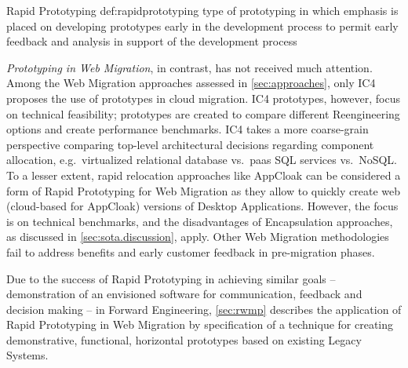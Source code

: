 \vspace{-10pt}
\begin{thesisdefinition}{Rapid Prototyping \autocite{ISO/IEEE24765Vocabulary}}{def:rapidprototyping}
type of prototyping in which emphasis is placed on developing prototypes early in the development process to permit early feedback and analysis in support of the development process
\end{thesisdefinition}

\emph{\gls{Prototyping} in Web Migration}, in contrast, has not received much attention.
Among the \gls{Web Migration} approaches assessed in \cref{sec:approaches}, only IC4 \autocite{Fowley2017CloudSME} proposes the use of prototypes in cloud migration.
IC4 prototypes, however, focus on technical feasibility; prototypes are created to compare different \gls{Reengineering} options and create performance benchmarks.
IC4 takes a more coarse-grain perspective comparing top-level architectural decisions regarding component allocation, e.g.~virtualized relational database vs.~\gls{paas} SQL services vs.~NoSQL.
To a lesser extent, rapid relocation approaches like AppCloak \autocite{Tak2014} can be considered a form of \gls{Rapid Prototyping} for \gls{Web Migration} as they allow to quickly create \gls{web} (cloud-based for AppCloak) versions of  \glspl{Desktop Application}.
However, the focus is on technical benchmarks, and the disadvantages of \gls{Encapsulation} approaches, as discussed in \cref{sec:sota.discussion}, apply.
Other \gls{Web Migration} methodologies fail to address benefits and early customer feedback in pre-migration phases.
\vspace{-4pt}

Due to the success of \gls{Rapid Prototyping} in achieving similar goals -- demonstration of an envisioned software for communication, feedback and decision making -- in \gls{Forward Engineering}, \cref{sec:rwmp} describes the application of \gls{Rapid Prototyping} in \gls{Web Migration} by specification of a technique for creating demonstrative, functional, horizontal prototypes based on existing \glspl{Legacy System}.

